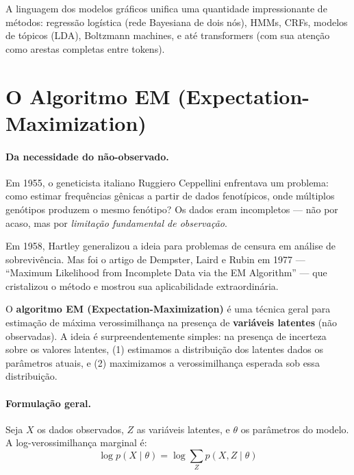 \documentclass{tufte-handout}
\begin{document}
\begin{remark}
    A linguagem dos modelos gráficos unifica uma quantidade impressionante de métodos: regressão logística (rede Bayesiana de dois nós), HMMs, CRFs, modelos de tópicos (LDA), Boltzmann machines, e até transformers (com sua atenção como arestas completas entre tokens).
\end{remark}

\section{O Algoritmo EM (Expectation-Maximization)}

\paragraph{Da necessidade do não-observado.}

Em 1955, o geneticista italiano Ruggiero Ceppellini enfrentava um problema: como estimar frequências gênicas a partir de dados fenotípicos, onde múltiplos genótipos produzem o mesmo fenótipo? Os dados eram incompletos --- não por acaso, mas por \textit{limitação fundamental de observação}.

Em 1958, Hartley generalizou a ideia para problemas de censura em análise de sobrevivência. Mas foi o artigo de Dempster, Laird e Rubin em 1977 --- ``Maximum Likelihood from Incomplete Data via the EM Algorithm'' --- que cristalizou o método e mostrou sua aplicabilidade extraordinária.

O \textbf{algoritmo EM (Expectation-Maximization)} é uma técnica geral para estimação de máxima verossimilhança na presença de \textbf{variáveis latentes} (não observadas). A ideia é surpreendentemente simples: na presença de incerteza sobre os valores latentes, (1) estimamos a distribuição dos latentes dados os parâmetros atuais, e (2) maximizamos a verossimilhança esperada sob essa distribuição.

\paragraph{Formulação geral.}

Seja $X$ os dados observados, $Z$ as variáveis latentes, e $\theta$ os parâmetros do modelo. A log-verossimilhança marginal é:
\[
\log p(X \mid \theta) = \log \sum_Z p(X, Z \mid \theta)
\]
\end{document}
